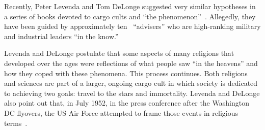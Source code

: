 Recently, Peter Levenda and Tom DeLonge suggested very similar hypotheses in a series of books devoted to cargo cults and ``the phenomenon''~\cite{DeLongeLevenda-Gods,DeLongeLevenda-Men}. Allegedly, they have been guided by approximately ten~\cite{Iandoli2023Feb} ``advisers'' who are high-ranking military and industrial leaders ``in the know.''

Levenda and DeLonge postulate that some aspects of many religions that developed over the ages were reflections of what people saw ``in the heavens'' and how they coped with these phenomena. This process continues. Both religions and sciences are part of a larger, ongoing cargo cult in which society is dedicated to achieving two goals: travel to the stars and immortality. Levenda and DeLonge also point out that, in July 1952, in the press conference after the Washington DC flyovers, the US Air Force attempted to frame those events in religious terms~\cite[Footnote~100]{DeLongeLevenda-Men}.
